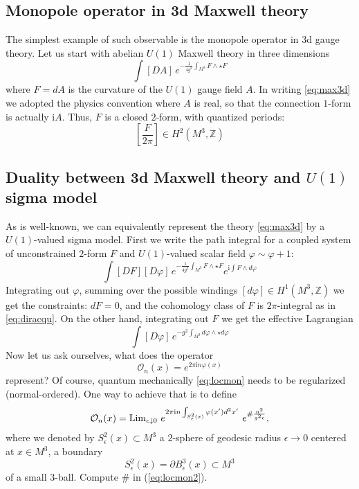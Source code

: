 \documentclass[12pt]{article}
\newcommand{\problemname}{}
\newenvironment{statement}[1]
 {\renewcommand{\problemname}{#1}\problem}
 {\endproblem}
\numberwithin{equation}{section}
\newcommand{\ep}{{\epsilon}}
\newcommand\beq{\begin{equation}}
\newcommand\eeq{\end{equation}}
\theoremstyle{definition}
\newcommand {\BZ}   {\mathbb Z}
\newcommand {\CalO} {\mathcal O}
\newcommand {\ii} {\mathrm{i}}
\begin{document}
\subsection{Monopole operator in 3d Maxwell theory}
The simplest example of such observable is the monopole operator in 3d gauge theory. Let us start with abelian $U(1)$ Maxwell theory in three dimensions
\beq
\int [DA] \, e^{-\frac{1}{4g^2} \int_{M^3} F \wedge \star F}
\label{eq:max3d}
\eeq
where $F = dA$ is the curvature of the $U(1)$ gauge field $A$. In writing \eqref{eq:max3d} we adopted the physics convention where $A$ is real, so that the connection $1$-form is actually ${\ii}A$. Thus, $F$ is a closed $2$-form, with quantized periods:
\beq
\left[ \frac{F}{2\pi} \right] \in H^{2}(M^3, {\BZ})
\label{eq:diracqu}
\eeq
\subsection{Duality between 3d Maxwell theory and $U(1)$ sigma model}
As is well-known, we can equivalently represent the theory \eqref{eq:max3d} by a $U(1)$-valued sigma model. First we write the path integral for a coupled system of unconstrained $2$-form $F$ and $U(1)$-valued scalar field ${\varphi}\sim {\varphi} + 1$:
\beq
\int [DF][D{\varphi}] \, e^{-\frac{1}{4g^2} \int_{M^3} F \wedge \star F} e^{\ii \int F \wedge d{\varphi}}
\label{eq:max3d2}
\eeq
Integrating out $\varphi$, summing over the possible windings $[d\varphi] \in H^{1}(M^3, {\BZ})$ we get the constraints: $dF = 0$, and the cohomology class of $F$ is $2\pi$-integral as in \eqref{eq:diracqu}. On the other hand, integrating out $F$ we get the effective Lagrangian
\beq
\int [D{\varphi}] \, e^{-g^2 \int_{M^3} d{\varphi} \wedge \star d{\varphi}}
\label{eq:max3d3}
\eeq
Now let us ask ourselves, what does the operator
\beq
{\CalO}_{n}(x) = e^{2\pi \ii n {\varphi}(x)}
\label{eq:locmon}
\eeq
represent? Of course, quantum mechanically \eqref{eq:locmon} needs to be regularized (normal-ordered). One way to achieve that is to define
\beq
{\CalO}_{n}(x) = {\rm Lim}_{{\ep} \downarrow 0} \ e^{2\pi \ii n \int_{S^{2}_{\ep}(x)} {\varphi}(x') d^2x'}\ e^{\# \frac{n^2}{g^2 \ep}},
\label{eq:locmon2}
\eeq
where we denoted by $S^{2}_{\ep}(x) \subset M^3$ a $2$-sphere of geodesic radius $\ep \to 0$ centered at $x \in M^3$, a boundary
\beq
S^{2}_{\ep}(x) = {\partial} B^{3}_{\ep}(x) \subset M^3
\eeq
of a small $3$-ball. 
\begin{statement}{Problem 6}\normalfont \label{prob6}
Compute $\#$ in (\ref{eq:locmon2}).
\end{statement}
\end{document}
